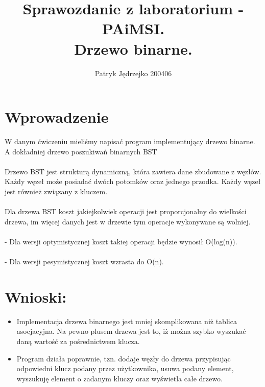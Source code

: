 \documentclass{article}
\author{Patryk Jędrzejko 200406}
\title{Sprawozdanie z laboratorium - PAiMSI. \\Drzewo binarne.}
\begin{document}
\maketitle

\section{Wprowadzenie}
W danym ćwiczeniu mieliśmy napisać program implementujący drzewo binarne. A dokładniej drzewo poszukiwań binarnych BST
\\\\Drzewo BST jest strukturą dynamiczną, która zawiera dane zbudowane z węzłów. Każdy węzeł może posiadać dwóch potomków oraz jednego przodka. Każdy węzeł jest również związany z kluczem.
\\\\Dla drzewa BST koszt jakiejkolwiek operacji jest proporcjonalny do wielkości drzewa, im więcej danych jest w drzewie tym operacje wykonywane są wolniej.
\\\\- Dla wersji optymistycznej koszt takiej operacji będzie wynosił O(log(n)).
\\\\- Dla wersji pesymistycznej koszt wzrasta do O(n).


\section{Wnioski:}
\begin{itemize}
  \item Implementacja drzewa binarnego jest mniej skomplikowana niż tablica asocjacyjna. Na pewno plusem drzewa jest to, iż można szybko wyszukać daną wartość za pośrednictwem klucza.
  \item Program działa poprawnie, tzn. dodaje węzły do drzewa przypisując odpowiedni klucz podany przez użytkownika, usuwa podany element, wyszukuję element o zadanym kluczy oraz wyświetla całe drzewo.
\end{itemize}
\end{document}
